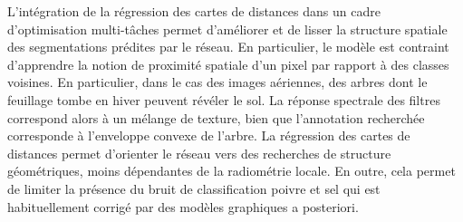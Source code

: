 L'intégration de la régression des cartes de distances dans un cadre d'optimisation multi-tâches permet d'améliorer et de lisser la structure spatiale des segmentations prédites par le réseau. En particulier, le modèle est contraint d'apprendre la notion de proximité spatiale d'un pixel par rapport à des classes voisines. En particulier, dans le cas des images aériennes, des arbres dont le feuillage tombe en hiver peuvent révéler le sol. La réponse spectrale des filtres correspond alors à un mélange de texture, bien que l'annotation recherchée corresponde à l'enveloppe convexe de l'arbre. La régression des cartes de distances permet d'orienter le réseau vers des recherches de structure géométriques, moins dépendantes de la radiométrie locale. En outre, cela permet de limiter la présence du bruit de classification poivre et sel qui est habituellement corrigé par des modèles graphiques a posteriori.



